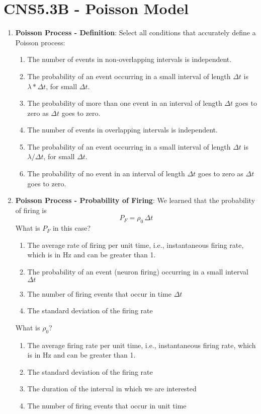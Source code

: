 \documentclass[11pt,letterpaper]{article}
\begin{document}
\section{CNS5.3B - Poisson Model}
\begin{enumerate}
    \item \textbf{Poisson Process - Definition}: Select all conditions that accurately define a Poisson process:
    \begin{enumerate}
        \item The number of events in non-overlapping intervals is independent.
        \item The probability of an event occurring in a small interval of length $\Delta t$ is $\lambda*\Delta t$, for small $\Delta t$.
        \item The probability of more than one event in an interval of length $\Delta t$ goes to zero as $\Delta t$ goes to zero.
        \item The number of events in overlapping intervals is independent. 
        \item The probability of an event occurring in a small interval of length $\Delta t$ is $\lambda/\Delta t$, for small $\Delta t$.
        \item The probability of no event in an interval of length $\Delta t$ goes to zero as $\Delta t$ goes to zero.
    \end{enumerate}

    \item \textbf{Poisson Process - Probability of Firing}: We learned that the probability of firing is
    \begin{equation}
        P_F = \rho_0 \, \Delta t
    \end{equation}
    What is $P_F$ in this case?
    \begin{enumerate}
        \item The average rate of firing per unit time, i.e., instantaneous firing rate, which is in Hz and can be greater than 1.
        \item The probability of an event (neuron firing) occurring in a small interval $\Delta t$
        \item The number of firing events that occur in time $\Delta t$
        \item The standard deviation of the firing rate
    \end{enumerate}
    What is $\rho_0$?
    \begin{enumerate}
        \item The average firing rate per unit time, i.e., instantaneous firing rate, which is in Hz and can be greater than 1.
        \item The standard deviation of the firing rate
        \item The duration of the interval in which we are interested
        \item The number of firing events that occur in unit time
    \end{enumerate}


\end{enumerate}
\end{document}
